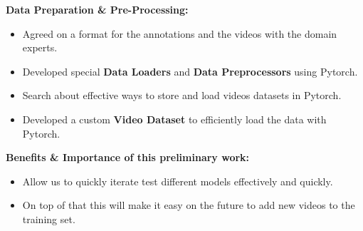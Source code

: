 \begin{frame}
    \textbf{Data Preparation \& Pre-Processing:}

    \vspace{0.5em}

    \begin{itemize}
        \item Agreed on a format for the annotations and the videos with the domain experts.
        \item Developed special \textbf{Data Loaders} and \textbf{Data Preprocessors} using Pytorch.
        \item Search about effective ways to store and load videos datasets in Pytorch.
        \item Developed a custom \textbf{Video Dataset} to efficiently load the data with Pytorch.
    \end{itemize}

    \vspace{1em}

    \textbf{Benefits \& Importance of this preliminary work:}

    \vspace{0.5em}

    \begin{itemize}
        \item Allow us to quickly iterate test different models effectively and quickly.
        \item On top of that this will make it easy on the future to add new videos to the training set.
    \end{itemize}
\end{frame}

